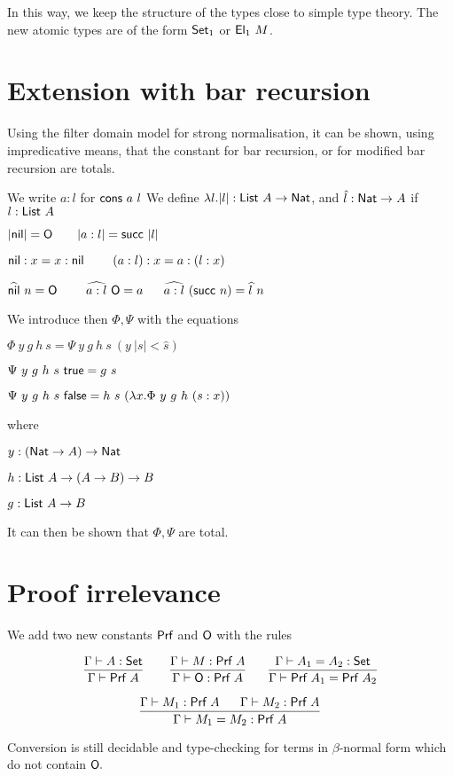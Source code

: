 \documentclass[11pt]{article}
\def\SET{\hbox{\sf Set}}
\def\EL{\hbox{\sf El}}
\def\PROOF{\hbox{\sf Prf}}
\def\NAT{\hbox{\sf Nat}}
\def\LIST{\hbox{\sf List}}
\def\ZERO{\hbox{\sf O}}
\def\SUCC{\hbox{\sf succ}}
\def\NIL{\hbox{\sf nil}}
\def\CONS{\hbox{\sf cons}}
\def\TRUE{\hbox{\sf true}}
\def\FALSE{\hbox{\sf false}}
\begin{document}
 In this way, we keep the structure of the types close to simple type
theory. The new atomic types are of the form $\SET_1$ or $\EL_1~M$. 

\section{Extension with bar recursion}

 Using the filter domain model for strong normalisation, it can be shown, using
impredicative means, that the constant for bar recursion, or for modified
bar recursion are totals.

 We write $a:l$ for $\CONS~a~l$
We define $\lambda l.|l|:\LIST~A\rightarrow \NAT$, and  $\hat{l}:\NAT\rightarrow A$ if $l:\LIST~A$

 $|\NIL| = \ZERO~~~~~~|a:l| = \SUCC~|l|$

 $\NIL:x = x:\NIL~~~~~~~(a:l):x = a:(l:x)$

 $\widehat{\NIL}~n = \ZERO~~~~~~~\widehat{a:l}~\ZERO = a~~~~~\widehat{a:l}~(\SUCC~n) = \widehat{l}~n$

 We introduce then $\Phi,\Psi$ with the equations

 $\Phi~y~g~h~s = \Psi~y~g~h~s~(y~|s|<\hat{s})$

 $\Psi~y~g~h~s~\TRUE = g~s$

 $\Psi~y~g~h~s~\FALSE = h~s~(\lambda x.\Phi~y~g~h~(s:x))$

where

 $y:(\NAT\rightarrow A)\rightarrow\NAT$

 $h:\LIST~ A\rightarrow (A\rightarrow B)\rightarrow B$

 $g:\LIST~A\rightarrow B$

 It can then be shown that $\Phi,\Psi$ are total. 

\section{Proof irrelevance}

 We add two new constants $\PROOF$ and $\ZERO$ with the rules

$$
\frac{\Gamma\vdash A:\SET}{\Gamma\vdash \PROOF~A}~~~~~~
\frac{\Gamma\vdash M:\PROOF~A}{\Gamma\vdash \ZERO: \PROOF~A}~~~~~
\frac{\Gamma\vdash A_1=A_2:\SET}{\Gamma\vdash \PROOF~A_1 = \PROOF~A_2}
$$

$$
\frac{\Gamma\vdash M_1:\PROOF~A~~~~~\Gamma\vdash M_2:\PROOF~A}{\Gamma\vdash M_1=M_2:\PROOF~A}
$$

 Conversion is still decidable and type-checking for terms in $\beta$-normal
form which do not contain $\ZERO.$ 
\end{document}
